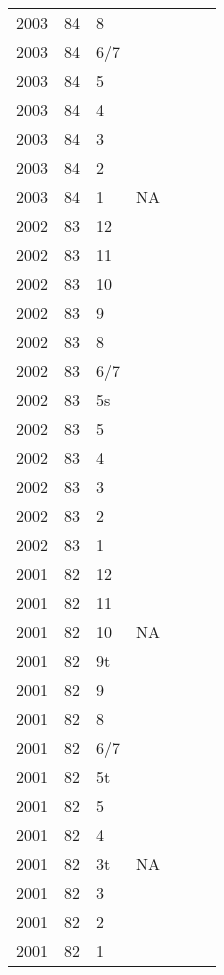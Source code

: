 \begin{longtable}{ |l|l|l|l|p{2.7cm}|l|p{2cm}| }
 2003 & 84 &     8 &         &  &  & \\
 2003 & 84 &   6/7 &         &  &  & \\
 2003 & 84 &     5 &         &  &  & \\
 2003 & 84 &     4 &         &  &  & \\
 2003 & 84 &     3 &         &  &  & \\
 2003 & 84 &     2 &         &  &  & \\
 2003 & 84 &     1 &     NA  &  &  & \\
 2002 & 83 &    12 &         &  &  & \\
 2002 & 83 &    11 &         &  &  & \\
 2002 & 83 &    10 &         &  &  & \\
 2002 & 83 &     9 &         &  &  & \\
 2002 & 83 &     8 &         &  &  & \\
 2002 & 83 &   6/7 &         &  &  & \\
 2002 & 83 &    5s &         &  &  & \\
 2002 & 83 &     5 &         &  &  & \\
 2002 & 83 &     4 &         &  &  & \\
 2002 & 83 &     3 &         &  &  & \\
 2002 & 83 &     2 &         &  &  & \\
 2002 & 83 &     1 &         &  &  & \\
 2001 & 82 &    12 &         &  &  & \\
 2001 & 82 &    11 &         &  &  & \\
 2001 & 82 &    10 &      NA &  &  & \\
 2001 & 82 &    9t &         &  &  & \\
 2001 & 82 &     9 &         &  &  & \\
 2001 & 82 &     8 &         &  &  & \\
 2001 & 82 &   6/7 &         &  &  & \\
 2001 & 82 &    5t &         &  &  & \\
 2001 & 82 &     5 &         &  &  & \\
 2001 & 82 &     4 &         &  &  & \\
 2001 & 82 &    3t &     NA  &  &  & \\
 2001 & 82 &     3 &         &  &  & \\
 2001 & 82 &     2 &         &  &  & \\
 2001 & 82 &     1 &         &  &  & \\

\end{longtable}

